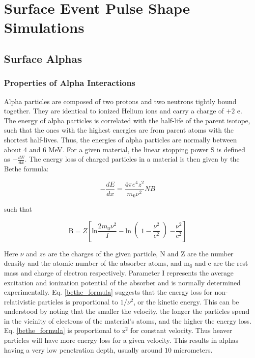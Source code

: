 \chapter{Surface Event Pulse Shape Simulations}

\section{Surface Alphas}

\subsection{Properties of Alpha Interactions}
Alpha particles are composed of two protons and two neutrons tightly bound together. They are identical to ionized Helium ions and carry a charge of $+2$ e. The energy of alpha particles is correlated with the half-life of the parent isotope, such that the ones with the highest energies are from parent atoms with the shortest half-lives. Thus, the energies of alpha particles are normally between about $4$ and $6$ MeV. For a given material, the linear stopping power S is defined as $-\frac{dE}{dx}$. The energy loss of charged particles in a material is then given by the Bethe formula:

\begin{equation}\label{bethe_formula}
    -\frac{dE}{dx} = \frac{4\pi e^4z^2}{m_0\nu^2}NB
\end{equation}

such that

\begin{equation}\label{bethe_B}
    \text{B}=Z\left[ \text{ln}\frac{2m_0\nu^2}{I}-\text{ln}\right(1-\frac{\nu^2}{c^2}\left)-\frac{\nu^2}{c^2}\right]
\end{equation}

Here $\nu$ and $ze$ are the charges of the given particle, N and Z are
the number density and the atomic number of the absorber atoms, and  m$_0$ and e are the rest mass and charge of electron respectively. Parameter I represents the average excitation and ionization potential of the absorber and is normally determined experimentally. Eq. \ref{bethe_formula} suggests that the energy loss for non-relativistic particles is proportional to $1/\nu^2$, or the kinetic energy. This can be understood by noting that the smaller the velocity, the longer the particles spend in the vicinity of electrons of the material's atoms, and the higher the energy loss. Eq. \ref{bethe_formula} is proportional to z$^2$ for constant velocity. Thus heaver particles will have more energy loss for a given velocity. This results in alphas having a very low penetration depth, usually around $10$ micrometers.

